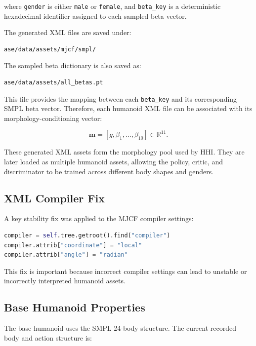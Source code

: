 \documentclass[11pt,a4paper]{article}
\begin{document}
where \texttt{gender} is either \texttt{male} or \texttt{female}, and \texttt{beta\_key} is a deterministic hexadecimal identifier assigned to each sampled beta vector.

The generated XML files are saved under:

\begin{lstlisting}
ase/data/assets/mjcf/smpl/
\end{lstlisting}

The sampled beta dictionary is also saved as:

\begin{lstlisting}
ase/data/assets/all_betas.pt
\end{lstlisting}

This file provides the mapping between each \texttt{beta\_key} and its corresponding SMPL beta vector.
Therefore, each humanoid XML file can be associated with its morphology-conditioning vector:

\begin{equation}
    \mathbf{m} = [g, \beta_1, \dots, \beta_{10}] \in \mathbb{R}^{11}.
\end{equation}

These generated XML assets form the morphology pool used by HHI.
They are later loaded as multiple humanoid assets, allowing the policy, critic, and discriminator to be trained across different body shapes and genders.

\subsection{XML Compiler Fix}

A key stability fix was applied to the MJCF compiler settings:

\begin{lstlisting}[language=Python]
compiler = self.tree.getroot().find("compiler")
compiler.attrib["coordinate"] = "local"
compiler.attrib["angle"] = "radian"
\end{lstlisting}

This fix is important because incorrect compiler settings can lead to unstable or incorrectly interpreted humanoid assets.

\subsection{Base Humanoid Properties}

The base humanoid uses the SMPL 24-body structure. The current recorded body and action structure is:
\end{document}
